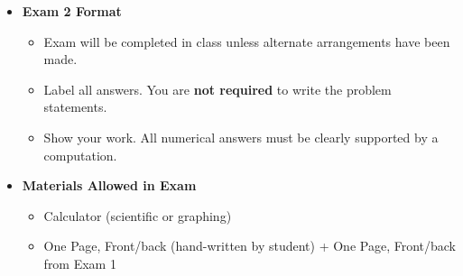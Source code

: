 \documentclass[11pt]{article}
\newcommand{\EXAMNUM}{2\hspace{0mm}}
\begin{document}
\begin{itemize}
             	\item  \textbf{\Large Exam \EXAMNUM \hspace{1mm} Format}
\begin{itemize}
		
			\item Exam will be completed in class unless alternate arrangements have been made.
			
			\item Label all answers. You are {\bf not required} to write the problem statements.

			\item Show your work. All numerical answers must be clearly supported by a computation. 
\end{itemize}


\vspace{5mm}		

		\item  \textbf{ Materials Allowed in Exam}

	\begin{itemize}

		\item  Calculator (scientific or graphing)
	
		\item  One Page, Front/back (hand-written by student) + One Page, Front/back from Exam 1
			

\end{itemize}
\end{itemize}
\end{document}
